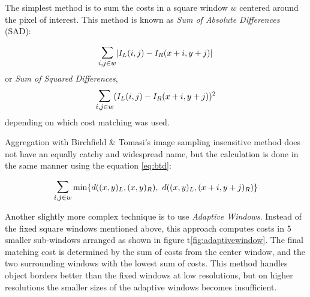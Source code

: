 The simplest method is to sum the costs in a square window $w$
centered around the pixel of interest. This method is known as
\textit{Sum of Absolute Differences} (SAD):

\begin{equation}
  \label{eq:sad}
  \mathlarger{\mathlarger{\sum}}_{i,j \in w} |I_L(i,j) - I_R(x + i, y + j)| 
\end{equation}
or \textit{Sum of Squared Differences},
\begin{equation}
  \label{eq:ssd}
  \mathlarger{\mathlarger{\sum}}_{i,j \in w} (I_L(i,j) - I_R(x + i, y  + j))^2 
\end{equation}
depending on which cost matching was used.

Aggregation with Birchfield \& Tomasi's image sampling insensitive
method does not have an equally catchy and widespread name, but the
calculation is done in the same manner using the equation
\ref{eq:btd}:

\begin{equation}
  \label{eq:bt}
  \mathlarger{\mathlarger{\sum}}_{i,j \in w} \min\{
  d((x,y)_L,(x,y)_R), \ d((x,y)_L, (x+i,y+j)_R) \}
\end{equation}

Another slightly more complex technique is to use \textit{Adaptive
  Windows}\cite{Okutomi and Kanade, 1992; Kanade and Okutomi, 1994;
  Veksler, 2001; Kang et al., 2001)}. Instead of the fixed square
windows mentioned above, this approach computes costs in 5 smaller
sub-windows arranged as shown in figure t\ref{fig:adaptivewindow}. The
final matching cost is determined by the sum of costs from the center
window, and the two surrounding windows with the lowest sum of costs.
This method handles object borders better than the fixed windows at
low resolutions, but on higher resolutions the smaller sizes of the
adaptive windows becomes insufficient\cite{gpugems}.



